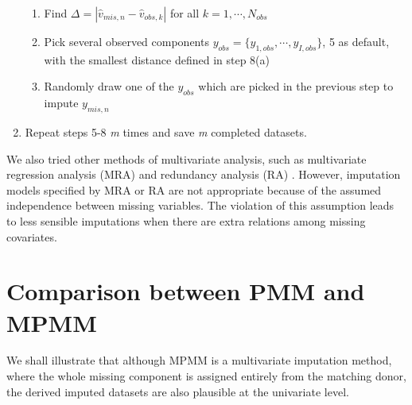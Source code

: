 \begin{enumerate}
		\begin{enumerate}
			\item Find $\Delta=|\hat{v}_{mis,n}-\hat{v}_{obs,k}|$ for all $k=1,\cdots,N_{obs}$
			\item Pick several observed components $y_{obs} = \{y_{1, obs},\cdots,y_{I, obs}\}$, 5 as default, with the smallest distance defined in step 8(a)
			\item Randomly draw one of the $y_{obs}$ which are picked in the previous step to impute $y_{mis,n}$ 
		\end{enumerate}
		\item Repeat steps 5-8 \emph{m} times and save \emph{m} completed datasets.
	\end{enumerate}
	
	We also tried other methods of multivariate analysis, such as multivariate regression analysis (MRA) \citep[chapter 10]{rencher2003methods} and redundancy analysis (RA) \citep{van1977redundancy}. However, imputation models specified by MRA or RA are not appropriate because of the assumed independence between missing variables. The violation of this assumption leads to less sensible imputations when there are extra relations among missing covariates. 
	
	\section{Comparison between PMM and MPMM}
	\label{sec:3.3}
	We shall illustrate that although MPMM is a multivariate imputation method, where the whole missing component is assigned entirely from the matching donor, the derived imputed datasets are also plausible at the univariate level. 
	
